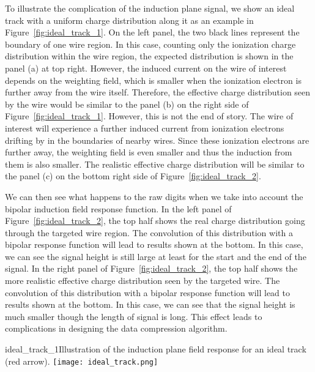 To illustrate the complication of the induction plane signal, we show 
an ideal track with a uniform charge distribution along it %
as 
an example in Figure~\ref{fig:ideal_track_1}. On the left panel, the 
two black lines represent the boundary of one wire region. In this case,  
counting only the ionization charge distribution within the wire region,
 the expected 
distribution is shown in the panel (a) at top right.  However, the induced current on the wire of 
interest depends on the weighting field, which is smaller when the ionization electron is 
further away from the wire itself. Therefore, the effective charge distribution seen by 
the wire would be similar to the panel (b) on the right side of 
Figure~\ref{fig:ideal_track_1}. However, this is not the end of story. The wire of interest will experience a 
further induced current from ionization electrons 
drifting by in the boundaries of nearby wires. Since these ionization electrons are further away, 
the weighting field is even smaller and thus the induction from them is 
also smaller. The realistic effective charge distribution will be similar to the panel (c) on 
the bottom right side of Figure~\ref{fig:ideal_track_2}. 

We can then see what happens to the raw digits when we take into account the bipolar induction 
field response function. In the left panel of Figure~\ref{fig:ideal_track_2}, the top half shows 
the real charge distribution going through the targeted wire region. The convolution of this 
distribution with a bipolar response function will lead to results shown at the bottom. In this 
case, we can see the signal height is still large at least for the start and the end of the 
signal. In the right panel of Figure~\ref{fig:ideal_track_2}, the top half shows the more 
realistic effective charge distribution seen by the targeted wire. The convolution of this 
distribution with a bipolar response function will lead to results shown at the bottom. In 
this case, we can see that the signal height is much smaller though the length of signal is 
long. This effect leads to complications in designing the data compression algorithm.

\begin{cdrfigure}{ideal_track_1}{Illustration of the induction plane field response for an ideal track (red arrow).}
  \texttt{[image: ideal\_track.png]}
\end{cdrfigure}

